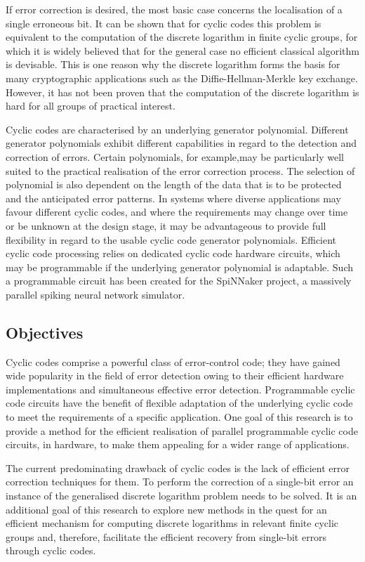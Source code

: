 \documentclass[a4paper, 11pt]{article}
\begin{document}
If error correction is desired, the most basic case concerns the localisation of a single erroneous bit. It can be shown that for cyclic codes this problem is equivalent to the computation of the discrete logarithm in finite cyclic groups, for which it is widely believed that for the general case no efficient classical algorithm is devisable. This is one reason why the discrete logarithm forms the basis for many cryptographic applications such as the Diffie-Hellman-Merkle key exchange. However, it has not been proven that the computation of the discrete logarithm is hard for all groups of practical interest.

Cyclic codes are characterised by an underlying generator polynomial. Different generator polynomials exhibit different capabilities in regard to the detection and correction of errors. Certain polynomials, for example,may be particularly well suited to the practical realisation of the error correction process. The selection of polynomial is also dependent on the length of the data that is to be protected and the anticipated error patterns. In systems where diverse applications may favour different cyclic codes, and where the requirements may change over time or be unknown at the design stage, it may be advantageous to provide full flexibility in regard to the usable cyclic code generator polynomials. Efficient cyclic code processing relies on dedicated cyclic code hardware circuits, which may be programmable if the underlying generator polynomial is adaptable. Such a programmable circuit has been created for the SpiNNaker project, a massively parallel spiking neural network simulator.

\subsection{Objectives}
Cyclic codes comprise a powerful class of error-control code; they have gained wide popularity in the field of error detection owing to their efficient hardware implementations and simultaneous effective error detection. Programmable cyclic code circuits have the benefit of flexible adaptation of the underlying cyclic code to meet the requirements of a specific application. One goal of this research is to provide a method for the efficient realisation of parallel programmable cyclic code circuits, in hardware, to make them appealing for a wider range of applications.

The current predominating drawback of cyclic codes is the lack of efficient error correction techniques for them. To perform the correction of a single-bit error an instance of the generalised discrete logarithm problem needs to be solved. It is an additional goal of this research to explore new methods in the quest for an efficient mechanism for computing discrete logarithms in relevant finite cyclic groups and, therefore, facilitate the efficient recovery from single-bit errors through cyclic codes.
\end{document}
